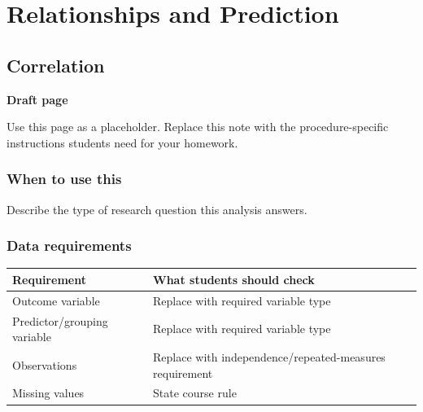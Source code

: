 \documentclass[
  letterpaper,
  DIV=11,
  numbers=noendperiod]{scrreprt}
\newcounter{none} %
\begin{document}
\part{Relationships and Prediction}

\chapter{Correlation}\label{correlation}

\begin{tcolorbox}[enhanced jigsaw, arc=.35mm, bottomrule=.15mm, breakable, colback=white, colframe=quarto-callout-note-color-frame, left=2mm, leftrule=.75mm, opacityback=0, rightrule=.15mm, toprule=.15mm]
\begin{minipage}[t]{5.5mm}
\textcolor{quarto-callout-note-color}{\faInfo}
\end{minipage}%
\begin{minipage}[t]{\textwidth - 5.5mm}

\vspace{-3mm}\textbf{Draft page}\vspace{3mm}

Use this page as a placeholder. Replace this note with the
procedure-specific instructions students need for your homework.

\end{minipage}%
\end{tcolorbox}

\section{When to use this}\label{when-to-use-this-8}

Describe the type of research question this analysis answers.

\section{Data requirements}\label{data-requirements-9}

{\def\LTcaptype{none} %
\begin{longtable}[]{@{}
  >{\raggedright\arraybackslash}p{}
  >{\raggedright\arraybackslash}p{}@{}}
\toprule\noalign{}
\begin{minipage}[b]{\linewidth}\raggedright
Requirement
\end{minipage} & \begin{minipage}[b]{\linewidth}\raggedright
What students should check
\end{minipage} \\
\midrule\noalign{}
\endhead
\bottomrule\noalign{}
\endlastfoot
Outcome variable & Replace with required variable type \\
Predictor/grouping variable & Replace with required variable type \\
Observations & Replace with independence/repeated-measures
requirement \\
Missing values & State course rule \\
\end{longtable}
}
\end{document}
